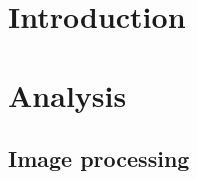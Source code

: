 
\usepackage{float}
\usepackage{graphicx}







\tableofcontents

\chapter{Introduction}


\chapter{Analysis}
	
\section{Image processing}
	

	



